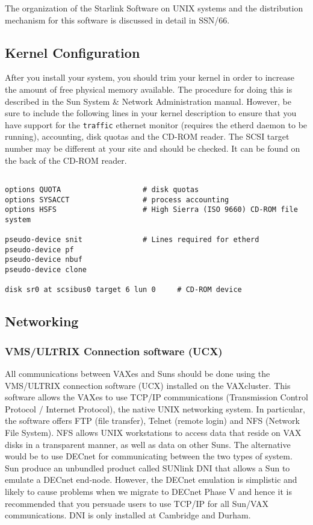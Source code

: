 The organization of the Starlink Software on UNIX systems  and the distribution
mechanism for this software is discussed  in detail in SSN/66.

\subsection{Kernel Configuration}

After you install your system, you should trim your kernel in order to increase
the amount of free physical memory available. The procedure for doing this is
described in the Sun System \& Network Administration manual. However, be sure
to include the following lines in your kernel description to ensure that you
have support for the {\tt traffic} ethernet monitor (requires the etherd daemon
to be running), accounting, disk quotas and the CD-ROM
reader. The SCSI target number may be different at your site and should
be checked. It can be found on the back of the CD-ROM reader.

\begin{verbatim}

options QUOTA                   # disk quotas
options SYSACCT                 # process accounting
options HSFS                    # High Sierra (ISO 9660) CD-ROM file system

pseudo-device snit              # Lines required for etherd
pseudo-device pf
pseudo-device nbuf
pseudo-device clone

disk sr0 at scsibus0 target 6 lun 0     # CD-ROM device

\end{verbatim}

\subsection{Networking}

\subsubsection{VMS/ULTRIX Connection software (UCX)}

All communications between VAXes and Suns should be done using the VMS/ULTRIX
connection software (UCX) installed on the VAXcluster. This software allows the
VAXes to use TCP/IP communications (Transmission Control Protocol / Internet
Protocol), the native UNIX networking system.  In particular, the software
offers FTP (file transfer), Telnet (remote login)  and NFS (Network File
System). NFS allows UNIX workstations to access data that reside on VAX disks
in a transparent manner, as well as data on other Suns. The alternative would
be to use DECnet for communicating between the two types of system. Sun
produce an unbundled product called SUNlink DNI that allows a Sun to emulate a
DECnet end-node. However, the DECnet emulation is simplistic and likely to
cause problems when we migrate to DECnet Phase V and hence it is recommended
that you persuade users to use TCP/IP for all Sun/VAX communications.
DNI is only installed at Cambridge and Durham.

